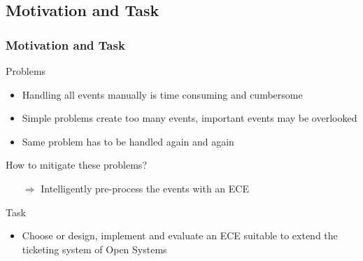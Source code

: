 \documentclass[10pt]{beamer}
\begin{document}
\subsection{Motivation and Task}
\begin{frame}
	\frametitle{Motivation and Task}
	\begin{block}{Problems}
		\begin{itemize}
			\item Handling all events manually is time consuming and
				cumbersome
			\item Simple problems create too many events, important events may
				be overlooked
			\item Same problem has to be handled again and again
		\end{itemize}
	\end{block}
	\begin{block}{How to mitigate these problems?}
		\begin{itemize}
			\item[$\Rightarrow$] Intelligently pre-process the events with an
				ECE
		\end{itemize}
	\end{block}
	\begin{block}{Task}
		\begin{itemize}
			\item Choose or design, implement and evaluate an ECE suitable to
				extend the ticketing system of Open Systems
		\end{itemize}
	\end{block}
\end{frame}

\end{document}

